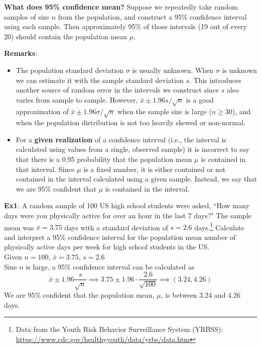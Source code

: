 \documentclass[fleqn, 11pt]{article}\usepackage[]{graphicx}\usepackage[]{color}
\begin{document}
\textbf{What does 95\% confidence mean?}
Suppose we repeatedly take random samples of size $n$ from the population, and construct a 95\% confidence interval using each sample. Then approximately 95\% of those intervals (19 out of every 20) should contain the population mean $\mu$.\\
\clearpage

\textbf{Remarks}:
\begin{itemize}
\item The population standard deviation $\sigma$ is usually unknown. When $\sigma$ is unknown we can estimate it with the sample standard deviation $s$.  This introduces another source of random error in the intervals we construct since $s$ also varies from sample to sample. However, $\bar{x} \pm 1.96 s / \sqrt{n}$ is a good approximation of $\bar{x} \pm 1.96 \sigma / \sqrt{n}$ when the sample size is large ($n \geq 30$), and when the population distribution is not too heavily skewed or non-normal. 
\item For a \textbf{given realization} of a confidence interval (i.e., the interval is calculated using values from a single, observed sample) it is incorrect to say that there is a 0.95 probability that the population mean $\mu$ is contained in that interval.  Since $\mu$ is a fixed number, it is either contained or not contained in the interval calculated using a given sample. Instead, we say that we are 95\% confident that $\mu$ is contained in the interval.  
\end{itemize}
\vspace{11pt}

\textbf{Ex1}:  A random sample of 100 US high school students were asked, ``How many days were you physically active for over an hour in the last 7 days?"  The sample mean was $\bar{x} = 3.75$ days with a standard deviation of $s=2.6$ days.\footnote{Data from the Youth Risk Behavior Surveillance System (YRBSS): \url{https://www.cdc.gov/healthyyouth/data/yrbs/data.htm}}  Calculate and interpret a 95\% confidence interval for the population mean number of physically active days per week for high school students in the US.\\  

{\color{blue}
Given $n=100$, $\bar{x} = 3.75$, $s = 2.6$\\
Sine $n$ is large, a 95\% confidence interval can be calculated as
$$\bar{x} \pm 1.96 \frac{s}{\sqrt{n}} \implies
3.75 \pm 1.96 \cdot \frac{2.6}{\sqrt{100}} \implies
(3.24, 4.26)$$
We are 95\% confident that the population mean, $\mu$, is between 3.24 and 4.26 days.\\
}
\vspace{2cm}
\end{document}
